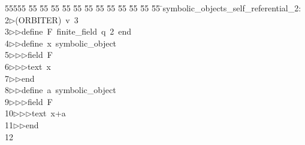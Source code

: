 %
%
\begin{tabbing}
55555 \= 55 \= 55 \= 55 \= 55 \= 55 \= 55 \= 55 \= 55 \= 55 \= 55 \= 55 \= 55 \= \>symbolic\_objects\_self\_referential\_2:\\[0pt]
2\>$\triangleright$\>(ORBITER)\ v\ 3\ \\[0pt]
3\>$\triangleright$\>$\triangleright$\>define\ F\ finite\_field\ q\ 2\ end\ \\[0pt]
4\>$\triangleright$\>$\triangleright$\>define\ x\ symbolic\_object\ \\[0pt]
5\>$\triangleright$\>$\triangleright$\>$\triangleright$\>field\ F\ \\[0pt]
6\>$\triangleright$\>$\triangleright$\>$\triangleright$\>text\ x\\[0pt]
7\>$\triangleright$\>$\triangleright$\>end\ \\[0pt]
8\>$\triangleright$\>$\triangleright$\>define\ a\ symbolic\_object\ \\[0pt]
9\>$\triangleright$\>$\triangleright$\>$\triangleright$\>field\ F\ \\[0pt]
10\>$\triangleright$\>$\triangleright$\>$\triangleright$\>text\ x+a\\[0pt]
11\>$\triangleright$\>$\triangleright$\>end\\[0pt]
12\>\end{tabbing}
